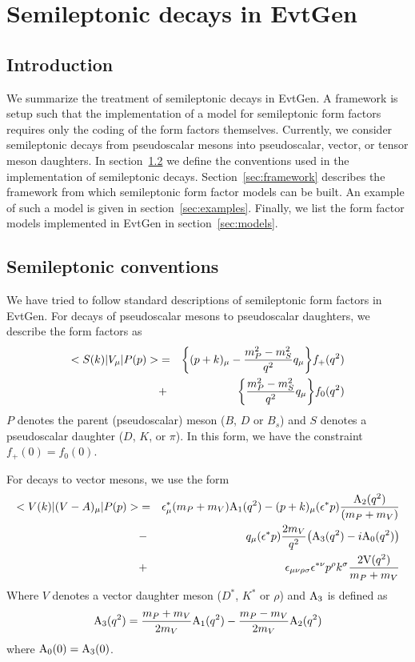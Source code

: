 \documentclass[6pt]{article}
\begin{document}
 

\section{Semileptonic decays in EvtGen}
\label{semileptonic}

\label{Semileptonic decays}
\subsection{Introduction}
We summarize the treatment of semileptonic decays in
EvtGen.  A framework is setup such that the implementation of
a model for semileptonic form factors requires only the 
coding of the form factors themselves.  Currently, we consider
semileptonic decays from pseudoscalar mesons into 
pseudoscalar, vector, or tensor meson daughters.
In section~\ref{sec:conventions} we define the
conventions used in the implementation of semileptonic
decays.  Section~\ref{sec:framework} describes the framework
from which semileptonic form factor models can be built.  An
example of such a model is given in section~\ref{sec:examples}.
Finally, we list the form factor models implemented in EvtGen
in section~\ref{sec:models}.

\subsection{Semileptonic conventions}
\label{sec:conventions}
We have tried to follow standard descriptions of semileptonic
form factors in EvtGen.  
For decays of 
pseudoscalar mesons to pseudoscalar daughters, we describe the
form factors as
\begin{eqnarray}
<S(k) \vert V_{\mu} \vert P(p) > & = &\biggl \{ (p+k)_{\mu} - 
{{m_P^2 - m_S^2} \over {q^2}} q_{\mu} \biggr \} f_+(q^2) \\
&+& 
\biggl \{  {{m_P^2 - m_S^2} \over {q^2}} q_{\mu} \biggr \} f_0(q^2) 
\nonumber
\end{eqnarray}
$P$ denotes the parent (pseudoscalar) meson ($B$, $D$ or $B_s$) and 
$S$ denotes a pseudoscalar daughter ($D$, $K$, or $\pi$).  In this
form, we have the constraint $f_+(0) = f_0(0)$. 

\noindent
For decays to vector mesons, we use the form
\begin{eqnarray}
<V(k) \vert (V-A)_{\mu} \vert P(p) > & = & 
 \epsilon^*_{\mu} (m_P+m_V) {\rm A}_1(q^2)
- (p+k)_{\mu} ( \epsilon^* p) { { {\rm A}_2(q^2)} \over {(m_P + m_V)}} \\
&-& q_{\mu} ( \epsilon^* p) { {2 m_V} \over {q^2}} \bigl ({\rm A}_3(q^2)
- i{\rm A}_0(q^2) \bigr ) \nonumber
\\
&+&\epsilon_{\mu \nu \rho \sigma} \epsilon^{* \nu} p^{\rho} k^{\sigma}
{ {2 {\rm V}(q^2)} \over { m_P + m_V} } \nonumber
\end{eqnarray}
Where $V$ denotes a vector daughter meson ($D^*$, $K^*$ or $\rho$)
and ${\rm A}_3$ is defined as 
\begin{equation}
{\rm A}_3(q^2) = {{m_P+ m_V} \over {2 m_V}} {\rm A}_1(q^2) -
{{m_P- m_V} \over {2 m_V}} {\rm A}_2(q^2) 
\end{equation}
where ${\rm A}_0 (0) = {\rm A}_3(0)$. \nonumber
\end{document}
